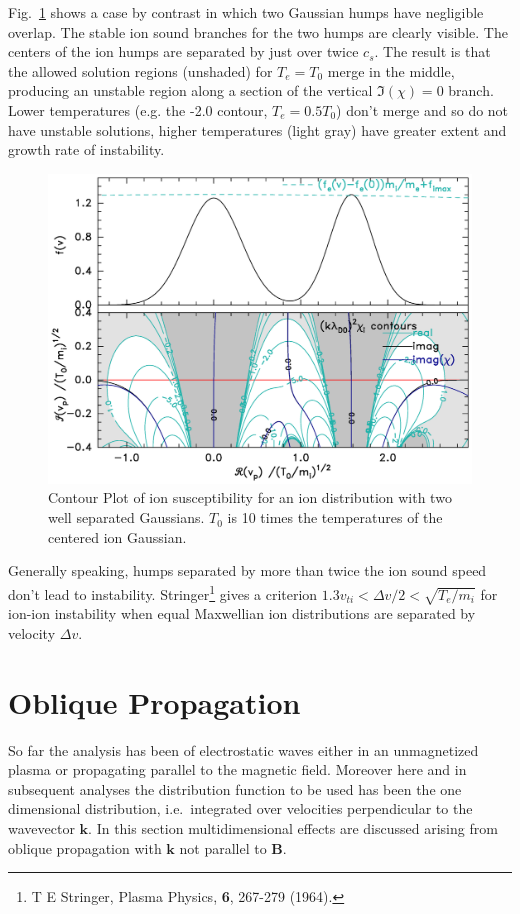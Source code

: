 \documentclass[12pt]{article}
\begin{document}
Fig.\ \ref{separatehumps} shows a case by contrast in which two
Gaussian humps have negligible overlap.
The stable ion sound branches for the two humps are clearly visible.
The centers of the ion humps are separated by just over twice
$c_s$. The result is that the allowed solution regions (unshaded) for
$T_e=T_0$ merge in the middle, producing an unstable region along a
section of the vertical $\Im(\chi)=0$ branch. Lower temperatures
(e.g. the -2.0 contour, $T_e=0.5T_0$) don't merge and so do not have
unstable solutions, higher temperatures (light gray) have greater
extent and growth rate of instability.
\begin{figure}[htp]
  \center\includegraphics[width=0.7\hsize]{twonarrowgauss}\endcenter
  \caption{Contour Plot of ion susceptibility for an ion distribution
    with two well separated Gaussians. $T_0$ is 10 times the
    temperatures of the centered ion Gaussian. \label{separatehumps}}
\end{figure}
Generally speaking, humps separated by more than twice the ion sound speed
don't lead to instability. Stringer\footnote{T E Stringer, Plasma
  Physics, {\bf 6}, 267-279 (1964).} gives a criterion $1.3 v_{ti}<
\Delta v/2 < \sqrt{T_e/m_i}$ for ion-ion instability when equal
Maxwellian ion distributions are separated by velocity $\Delta v$.

\section{Oblique Propagation}

So far the analysis has been of electrostatic waves either in an
unmagnetized plasma or propagating parallel to the magnetic field.
Moreover here and in subsequent analyses the distribution function to
be used has been the one dimensional distribution, i.e.\ integrated
over velocities perpendicular to the wavevector $\bm k$. In this
section multidimensional effects are discussed arising from oblique
propagation with $\bm k$ not parallel to $\bm B$.
\end{document}
